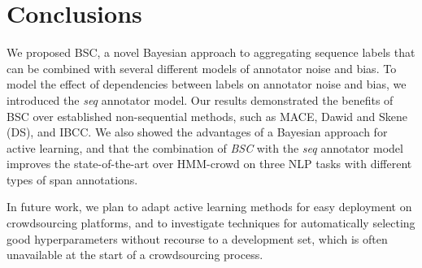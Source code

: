 \section{Conclusions}

We proposed BSC, a novel Bayesian approach to aggregating sequence labels
that can be combined with several different models of annotator noise and bias.
To model the effect of dependencies between labels on annotator noise and bias, we introduced 
the \emph{seq} annotator model.
Our results demonstrated the benefits of BSC over established non-sequential methods, such 
as MACE, Dawid and Skene (DS), and IBCC.
We also showed the advantages of a Bayesian approach for active learning,
and that the combination of \emph{BSC} with the \emph{seq} annotator model improves 
the state-of-the-art over HMM-crowd on three NLP tasks with different types of span annotations.

In future work, we plan to adapt active learning methods for easy deployment on crowdsourcing platforms,
and to investigate techniques for automatically selecting good hyperparameters without recourse to a development
set, which is often unavailable at the start of a crowdsourcing process.


